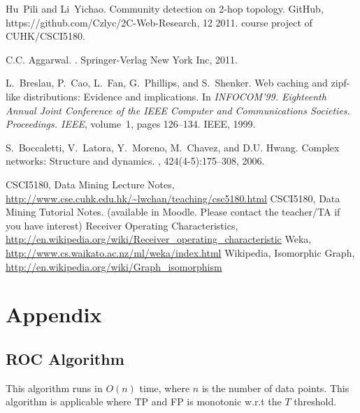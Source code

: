 \documentclass[11pt,a4paper]{article}
\begin{document}

\begin{thebibliography}{99}

Hu~Pili and Li~Yichao.
\newblock Community detection on 2-hop topology.
\newblock GitHub, https://github.com/Czlyc/2C-Web-Research, 12 2011.
\newblock course project of CUHK/CSCI5180.

C.C. Aggarwal.
.
\newblock Springer-Verlag New York Inc, 2011.

L.~Breslau, P.~Cao, L.~Fan, G.~Phillips, and S.~Shenker.
\newblock Web caching and zipf-like distributions: Evidence and implications.
\newblock In {\em INFOCOM'99. Eighteenth Annual Joint Conference of the IEEE
  Computer and Communications Societies. Proceedings. IEEE}, volume~1, pages
  126--134. IEEE, 1999.

S.~Boccaletti, V.~Latora, Y.~Moreno, M.~Chavez, and D.U. Hwang.
\newblock Complex networks: Structure and dynamics.
, 424(4-5):175--308, 2006.


	 CSCI5180, Data Mining Lecture Notes, 
		\url{http://www.cse.cuhk.edu.hk/~lwchan/teaching/csc5180.html}
	 CSCI5180, Data Mining Tutorial Notes. 
		(available in Moodle. Please contact the teacher/TA if you have 
		interest)
	 Receiver Operating Characteristics, 
		\url{http://en.wikipedia.org/wiki/Receiver_operating_characteristic}
	 Weka, 
		\url{http://www.cs.waikato.ac.nz/ml/weka/index.html}
	 Wikipedia, Isomorphic Graph, 
		\url{http://en.wikipedia.org/wiki/Graph_isomorphism}
\end{thebibliography}



\section*{Appendix}

\subsection*{ROC Algorithm}

This algorithm runs in $O(n)$ time, where 
$n$ is the number of data points. This algorithm 
is applicable where TP and FP is monotonic w.r.t 
the $T$ threshold. 
\end{document}
